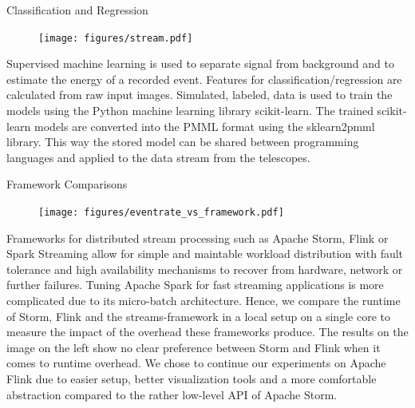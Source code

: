 \begin{multicols}{2}
    \begin{block}[]{Classification and Regression}%
      \begin{multicols}{2}
          \begin{figure}
            \texttt{[image: figures/stream.pdf]}\\
          \end{figure}
        \columnbreak
        Supervised machine learning is used to separate signal from background and to estimate
        the energy of a recorded event. Features for classification/regression are calculated from raw input
        images.
        Simulated, labeled, data is used to train the models using the Python machine learning library scikit-learn\cite{sklearn}.
        The trained scikit-learn models are converted into the PMML\cite{pmml} format using the sklearn2pmml\cite{sklearn2pmml} library.
        This way the stored model can be shared
        between programming languages and applied to the data stream from the telescopes.
      \end{multicols}
    \end{block}%

    \begin{block}[]{Framework Comparisons}%
      \begin{multicols}{2}
        \begin{figure}
          \texttt{[image: figures/eventrate\_vs\_framework.pdf]}\\
        \end{figure}
        \columnbreak
        Frameworks for distributed stream processing such as Apache Storm\cite{storm}, Flink\cite{flink} or Spark Streaming allow for simple and maintable workload distribution with fault tolerance and high availability mechanisms to recover from hardware, network or further failures.
        Tuning Apache Spark for fast streaming applications is more complicated due to its micro-batch architecture.
        Hence, we compare the runtime of Storm, Flink and the streams-framework\cite{streams} in
        a local setup on a single core to measure the impact of the overhead these frameworks produce.
        The results 
	on the image on the left
        show no clear preference between Storm and Flink when it comes to runtime overhead. 
        We chose to continue our experiments on Apache Flink due to easier setup, better visualization tools and a more comfortable abstraction compared to the rather low-level API of Apache Storm.
      \end{multicols}
    \end{block}%


\end{multicols}
